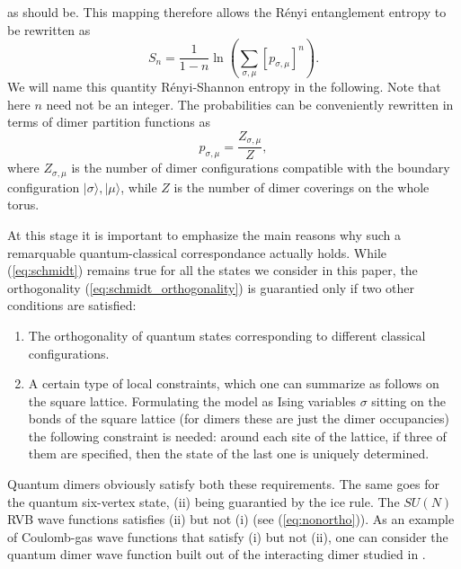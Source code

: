 \documentclass[11pt]{iopart}
\newcommand{\psm}{p_{\sigma,\mu}}
\begin{document}
as should be. This mapping therefore allows the R\'enyi entanglement entropy to be rewritten as
\begin{equation}
 S_n=\frac{1}{1-n}\ln \left(\sum_{\sigma,\mu}[\psm]^n\right).
 \label{Spsm}
\end{equation}
We will name this quantity R\'enyi-Shannon entropy in the following. Note that here $n$ need not be an integer. The probabilities can be conveniently rewritten in terms of dimer partition functions as 
\begin{equation}
 \psm=\frac{Z_{\sigma,\mu}}{Z},
 \label{Zpsm}
\end{equation}
where $Z_{\sigma,\mu}$ is the number of dimer configurations compatible with the boundary configuration $|\sigma\rangle,|\mu\rangle$, while $Z$ is the number of dimer coverings on the whole torus. 

At this stage it is important to emphasize the main reasons why such a remarquable quantum-classical correspondance actually holds. While (\ref{eq:schmidt}) remains true for all the states we consider in this paper, the orthogonality (\ref{eq:schmidt_orthogonality}) is guarantied only if two other conditions are satisfied:
\begin{enumerate}
 \item The orthogonality of quantum states corresponding to different classical configurations. 
 \item A certain type of local constraints\cite{Shannonee}, which one can summarize as follows on the square lattice. Formulating the model as Ising variables $\sigma$ sitting on the bonds of the square lattice (for dimers these are just the dimer occupancies) the following constraint is needed: around each site of the lattice, if three of them are specified, then the state of the last one is uniquely determined.  
\end{enumerate}
Quantum dimers obviously satisfy both these requirements. The same goes for the quantum six-vertex state, (ii) being guarantied by the ice rule. The $SU(N)$ RVB wave functions satisfies (ii) but not (i) (see (\ref{eq:nonortho})). As an example of Coulomb-gas wave functions that satisfy (i) but not (ii), one can consider the quantum dimer wave function built out of the interacting dimer studied in \cite{Alet_dimers1,Alet_dimers2}. 
\end{document}
